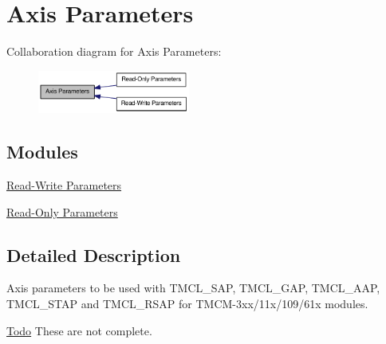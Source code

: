 \hypertarget{group__AxisParam}{
\section{Axis Parameters}
\label{group__AxisParam}
}


Collaboration diagram for Axis Parameters:\nopagebreak
\begin{figure}[H]
\begin{center}
\leavevmode
\includegraphics[width=142pt]{group__AxisParam}
\end{center}
\end{figure}
\subsection*{Modules}
\begin{DoxyCompactItemize}
\item 
\hyperlink{group__RWParam}{Read-\/Write Parameters}
\item 
\hyperlink{group__ROParam}{Read-\/Only Parameters}
\end{DoxyCompactItemize}


\subsection{Detailed Description}
Axis parameters to be used with TMCL\_\-SAP, TMCL\_\-GAP, TMCL\_\-AAP, TMCL\_\-STAP and TMCL\_\-RSAP for TMCM-\/3xx/11x/109/61x modules.

\begin{Desc}
\item[\hyperlink{todo__todo000004}{Todo}]These are not complete. \end{Desc}
